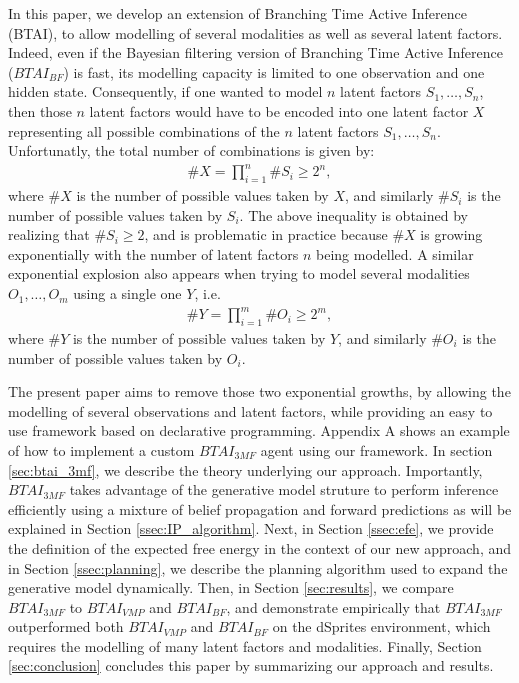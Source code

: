 \documentclass[twoside,11pt]{article}
\newcommand{\nb}[1]{\# #1}
\begin{document}
In this paper, we develop an extension of Branching Time Active Inference (BTAI), to allow modelling of several modalities as well as several latent factors. Indeed, even if the Bayesian filtering version of Branching Time Active Inference ($BTAI_{BF}$) is fast, its modelling capacity is limited to one observation and one hidden state. Consequently, if one wanted to model $n$ latent factors $S_1, \hdots, S_n$, then those $n$ latent factors would have to be encoded into one latent factor $X$ representing all possible combinations of the $n$ latent factors $S_1, \hdots, S_n$. Unfortunatly, the total number of combinations is given by:
\begin{align*}
\nb{X} = \prod_{i=1}^n \nb{S_i} \geq 2^n,
\end{align*}
where $\nb{X}$ is the number of possible values taken by $X$, and similarly $\nb{S_i}$ is the number of possible values taken by $S_i$. The above inequality is obtained by realizing that $\nb{S_i} \geq 2$, and is problematic in practice because $\nb{X}$ is growing exponentially with the number of latent factors $n$ being modelled. A similar exponential explosion also appears when trying to model several modalities $O_1, \hdots, O_m$ using a single one $Y$, i.e.
\begin{align*}
\nb{Y} = \prod_{i=1}^m \nb{O_i} \geq 2^m,
\end{align*}
where $\nb{Y}$ is the number of possible values taken by $Y$, and similarly $\nb{O_i}$ is the number of possible values taken by $O_i$. 

The present paper aims to remove those two exponential growths, by allowing the modelling of several observations and latent factors, while providing an easy to use framework based on declarative programming. Appendix A shows an example of how to implement a custom $BTAI_{3MF}$ agent using our framework. In section \ref{sec:btai_3mf}, we describe the theory underlying our approach. Importantly, $BTAI_{3MF}$ takes advantage of the generative model struture to perform inference efficiently using a mixture of belief propagation \citep{BP_and_DC, believe,belief_propagation} and forward predictions as will be explained in Section \ref{ssec:IP_algorithm}. Next, in Section \ref{ssec:efe}, we provide the definition of the expected free energy in the context of our new approach, and in Section \ref{ssec:planning}, we describe the planning algorithm used to expand the generative model dynamically. Then, in Section \ref{sec:results}, we compare $BTAI_{3MF}$ to $BTAI_{VMP}$ and $BTAI_{BF}$, and demonstrate empirically that $BTAI_{3MF}$ outperformed both $BTAI_{VMP}$ and $BTAI_{BF}$ on the dSprites environment, which requires the modelling of many latent factors and modalities. Finally, Section \ref{sec:conclusion} concludes this paper by summarizing our approach and results.
\end{document}
